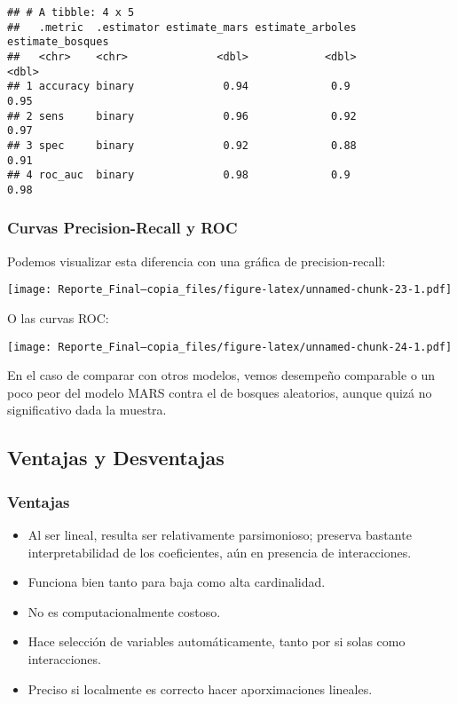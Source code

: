 \documentclass[
]{article}
\providecommand{\tightlist}{%
  \setlength{\itemsep}{0pt}\setlength{\parskip}{0pt}}
\begin{document}
\begin{verbatim}
## # A tibble: 4 x 5
##   .metric  .estimator estimate_mars estimate_arboles estimate_bosques
##   <chr>    <chr>              <dbl>            <dbl>            <dbl>
## 1 accuracy binary              0.94             0.9              0.95
## 2 sens     binary              0.96             0.92             0.97
## 3 spec     binary              0.92             0.88             0.91
## 4 roc_auc  binary              0.98             0.9              0.98
\end{verbatim}

\hypertarget{curvas-precision-recall-y-roc}{%
\subsubsection{Curvas Precision-Recall y
ROC}\label{curvas-precision-recall-y-roc}}

Podemos visualizar esta diferencia con una gráfica de precision-recall:

\texttt{[image: Reporte\_Final---copia\_files/figure-latex/unnamed-chunk-23-1.pdf]}

O las curvas ROC:

\texttt{[image: Reporte\_Final---copia\_files/figure-latex/unnamed-chunk-24-1.pdf]}

En el caso de comparar con otros modelos, vemos desempeño comparable o
un poco peor del modelo MARS contra el de bosques aleatorios, aunque
quizá no significativo dada la muestra.

\hypertarget{ventajas-y-desventajas}{%
\subsection{Ventajas y Desventajas}\label{ventajas-y-desventajas}}

\hypertarget{ventajas}{%
\subsubsection{Ventajas}\label{ventajas}}

\begin{itemize}
\tightlist
\item
  Al ser lineal, resulta ser relativamente parsimonioso; preserva
  bastante interpretabilidad de los coeficientes, aún en presencia de
  interacciones.
\item
  Funciona bien tanto para baja como alta cardinalidad.
\item
  No es computacionalmente costoso.
\item
  Hace selección de variables automáticamente, tanto por si solas como
  interacciones.
\item
  Preciso si localmente es correcto hacer aporximaciones lineales.
\end{itemize}
\end{document}
